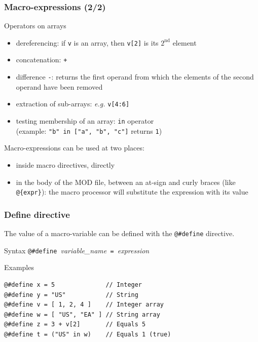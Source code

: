 \documentclass{beamer}
\begin{document}
\begin{frame}[fragile=singleslide]
  \frametitle{Macro-expressions (2/2)}
  \begin{block}{Operators on arrays}
    \begin{itemize}
    \item dereferencing: if \texttt{v} is an array, then \texttt{v[2]} is its $2^{\textrm{nd}}$ element
    \item concatenation: \texttt{+}
    \item difference \texttt{-}: returns the first operand from which the elements of the second operand have been removed
    \item extraction of sub-arrays: \textit{e.g.} \texttt{v[4:6]}
    \item testing membership of an array: \texttt{in} operator \\ (example:
      \texttt{"b" in ["a", "b", "c"]} returns \texttt{1})
    \end{itemize}
  \end{block}

  Macro-expressions can be used at two places:
  \begin{itemize}
  \item inside macro directives, directly
  \item in the body of the MOD file, between an at-sign and curly braces (like \verb+@{expr}+): the macro processor will substitute the expression with its value
  \end{itemize}
\end{frame}

\begin{frame}[fragile=singleslide]
  \frametitle{Define directive}

  The value of a macro-variable can be defined with the \verb+@#define+ directive.

  \begin{block}{Syntax}
    \verb+@#define +\textit{variable\_name}\verb+ = +\textit{expression}
  \end{block}

  \begin{block}{Examples}
\begin{verbatim}
@#define x = 5              // Integer
@#define y = "US"           // String
@#define v = [ 1, 2, 4 ]    // Integer array
@#define w = [ "US", "EA" ] // String array
@#define z = 3 + v[2]       // Equals 5
@#define t = ("US" in w)    // Equals 1 (true)
\end{verbatim}
  \end{block}
\end{frame}
\end{document}
